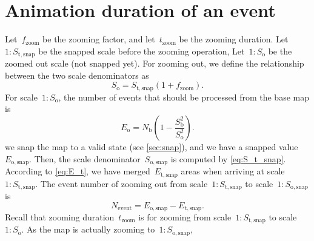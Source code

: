\documentclass[twocolumn]{svjour3}          %
\begin{document}
\section{Animation duration of an event}
\label{appx:animation_duration_event}


Let~$f_\mathrm{zoom}$ be the zooming factor, and 
let~$t_\mathrm{zoom}$ be the zooming duration.
Let~$1:S_\mathrm{t,snap}$ be the snapped scale before the zooming operation, 
Let~$1:S_\mathrm{o}$ be the zoomed out scale (not snapped yet).
For zooming out, we define the relationship 
between the two scale denominators as
\begin{equation}
\label{eq:S_o}
S_\mathrm{o} = S_\mathrm{t,snap} (1 + f_\mathrm{zoom}).
\end{equation}
For scale~$1:S_\mathrm{o}$, the number of events
that should be processed from the base map is
\begin{equation*}
\label{eq:E_o}
E_\mathrm{o} = N_\mathrm{b} \left(1-\frac{S^2_\mathrm{b}}{S^2_\mathrm{o}}\right).
\end{equation*}
we snap the map to a valid state 
(see \sect\ref{sec:snap}),
and we have a snapped value~$E_\mathrm{o,snap}$.
Then, the scale denominator~$S_\mathrm{o,snap}$
is computed by \eq\ref{eq:S_t_snap}.
According to \eq\ref{eq:E_t}, we have merged~$E_\mathrm{t,snap}$ areas 
when arriving at scale~$1:S_\mathrm{t,snap}$.
The event number of zooming out
from scale~$1:S_\mathrm{t,snap}$ to scale~$1:S_\mathrm{o,snap}$ is
\begin{equation}
\label{eq:N_event}
N_\mathrm{event} = 
E_\mathrm{o,snap} - E_\mathrm{t,snap}.
\end{equation}
Recall that zooming duration~$t_\mathrm{zoom}$ is for zooming 
from scale~$1:S_\mathrm{t,snap}$ to scale~$1:S_\mathrm{o}$.
As the map is actually zooming to~$1:S_\mathrm{o,snap}$,
\end{document}
